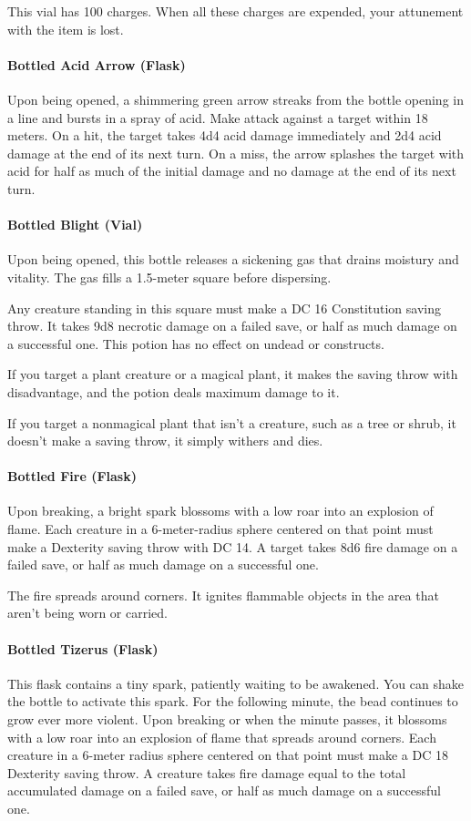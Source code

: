     This vial has 100 charges.
    When all these charges are expended, your attunement with the item is lost.
\paragraph{Bottled Acid Arrow (Flask)} %
    Upon being opened, a shimmering green arrow streaks from the bottle opening in a line and bursts in a spray of acid.
    Make attack against a target within 18 meters.
    On a hit, the target takes 4d4 acid damage immediately and 2d4 acid damage at the end of its next turn.
    On a miss, the arrow splashes the target with acid for half as much of the initial damage and no damage at the end of its next turn.
\paragraph{Bottled Blight (Vial)} %
    Upon being opened, this bottle releases a sickening gas that drains moistury and vitality.
    The gas fills a 1.5-meter square before dispersing.

    Any creature standing in this square must make a DC 16 Constitution saving throw.
    It takes 9d8 necrotic damage on a failed save, or half as much damage on a successful one.
    This potion has no effect on undead or constructs.

    If you target a plant creature or a magical plant, it makes the saving throw with disadvantage, and the potion deals maximum damage to it.

    If you target a nonmagical plant that isn't a creature, such as a tree or shrub, it doesn't make a saving throw, it simply withers and dies.
\paragraph{Bottled Fire (Flask)} %
    Upon breaking, a bright spark blossoms with a low roar into an explosion of flame.
    Each creature in a 6-meter-radius sphere centered on that point must make a Dexterity saving throw with DC 14.
    A target takes 8d6 fire damage on a failed save, or half as much damage on a successful one.

    The fire spreads around corners.
    It ignites flammable objects in the area that aren't being worn or carried.
\paragraph{Bottled Tizerus (Flask)} %
    This flask contains a tiny spark, patiently waiting to be awakened.
    You can shake the bottle to activate this spark.
    For the following minute, the bead continues to grow ever more violent.
    Upon breaking or when the minute passes, it blossoms with a low roar into an explosion of flame that spreads around corners.
    Each creature in a 6-meter radius sphere centered on that point must make a DC 18 Dexterity saving throw.
    A creature takes fire damage equal to the total accumulated damage on a failed save, or half as much damage on a successful one.

